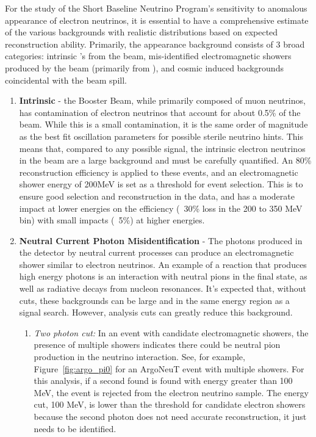 For the study of the Short Baseline Neutrino Program's sensitivity to anomalous appearance of electron neutrinos, it is essential to have a comprehensive estimate of the various backgrounds with realistic distributions based on expected reconstruction ability.  Primarily, the \nue appearance background consists of 3 broad categories: intrinsic \nue's from the beam, mis-identified electromagnetic showers produced by the beam (primarily from \numu), and cosmic induced backgrounds coincidental with the beam spill.

\begin{enumerate}

  \item {\bf Intrinsic \nue } - the Booster Beam, while primarily composed of muon neutrinos, has contamination of electron neutrinos that account for about 0.5\% of the beam.  While this is a small contamination, it is the same order of magnitude as the best fit oscillation parameters for possible sterile neutrino hints. This means that, compared to any possible signal, the intrinsic electron neutrinos in the beam are a large background and must be carefully quantified.  An 80\% reconstruction efficiency is applied to these events, and an electromagnetic shower energy of 200MeV is set as a threshold for event selection.  This is to ensure good selection and reconstruction in the data, and has a moderate impact at lower energies on the efficiency (~30\% loss in the 200 to 350 MeV bin) with small impacts (~5\%) at higher energies.



  \item {\bf Neutral Current Photon Misidentification} - The photons produced in the detector by neutral current processes can produce an electromagnetic shower similar to electron neutrinos.  An example of a reaction that produces high energy photons is an interaction with neutral pions in the final state, as well as radiative decays from nucleon resonances. It's expected that, without cuts, these backgrounds can be large and in the same energy region as a signal search. However, analysis cuts can greatly reduce this background.

  \begin{enumerate}

    \item{\em Two photon cut:} In an event with candidate electromagnetic showers, the presence of multiple showers indicates there could be neutral pion production in the neutrino interaction.  See, for example, Figure~\ref{fig:argo_pi0} for an ArgoNeuT event with multiple showers.  For this analysis, if a second found is found with energy greater than 100 MeV, the event is rejected from the electron neutrino sample.  The energy cut, 100 MeV, is lower than the threshold for candidate electron showers because the second photon does not need accurate reconstruction, it just needs to be identified.


\end{enumerate}
\end{enumerate}

